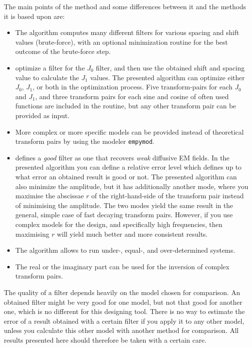 \documentclass[paper,twocolumn,twoside]{geophysics}
\begin{document}
The main points of the method and some differences between it and the methods
it is based upon are:
\begin{itemize}
  \item The algorithm computes many different filters for various spacing and
    shift values (brute-force), with an optional minimization routine for
    the best outcome of the brute-force step.
  \item \cite{GP.07.Kong, GEO.12.Key} optimize a filter for the $J_0$ filter,
    and then use the obtained shift and spacing value to calculate the $J_1$
    values. The presented algorithm can optimize either $J_0$, $J_1$, or both
    in the optimization process. Five transform-pairs for each $J_0$ and $J_1$,
    and three transform pairs for each sine and cosine of often used functions
    are included in the routine, but any other transform pair can be provided
    as input.
  \item More complex or more specific models can be provided instead of
    theoretical transform pairs by using the modeler \texttt{empymod}.
  \item \cite{GP.07.Kong} defines a \emph{good} filter as one that recovers
    \emph{weak} diffusive EM fields. In the presented algorithm you can define
    a relative error level which defines up to what error an obtained result is
    good or not. The presented algorithm can also minimize the amplitude, but
    it has additionally another mode, where you maximise the abscissae $r$ of
    the right-hand-side of the transform pair instead of minimising the
    amplitude. The two modes yield the same result in the general, simple case
    of fast decaying transform pairs. However, if you use complex models for
    the design, and specifically high frequencies, then maximising $r$ will
    yield much better and more consistent results.
  \item The algorithm allows to run under-, equal-, and over-determined
    systems.
  \item The real or the imaginary part can be used for the inversion of complex
    transform pairs.
\end{itemize}

The quality of a filter depends heavily on the model chosen for comparison. An
obtained filter might be very good for one model, but not that good for another
one, which is no different for this designing tool. There is no way to estimate
the error of a result obtained with a certain filter if you apply it to any
other model, unless you calculate this other model with another method for
comparison. All results presented here should therefore be taken with a certain
care.
\end{document}
